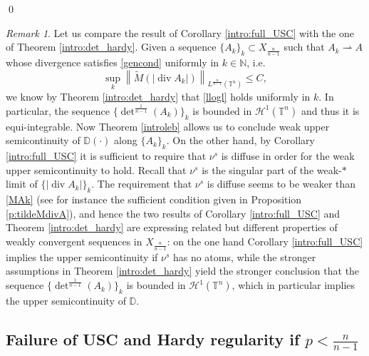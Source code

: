 \documentclass[10pt,reqno]{amsart}
\numberwithin{equation}{section}
\newcommand{\T}{\mathbb{T}}
\newcommand{\N}{\mathbb{N}}
\newcommand{\D}{\mathbb{D}}
\DeclareMathOperator{\dv}{div}
\theoremstyle{plain}
\theoremstyle{definition}
\theoremstyle{remark}
\newtheorem{rem}[Teo]{Remark}
\begin{document}
\qed




\begin{rem}\label{vs}
Let us compare the result of Corollary \ref{intro:full_USC} with the one of Theorem \ref{intro:det_hardy}. Given a sequence $\{A_k\}_k \subset X_\frac{n}{n - 1}$ such that $A_k \rightharpoonup A$ whose divergence satisfies \eqref{gencond} uniformly in $k \in \N$, i.e.
\begin{equation}\label{MAk}
\sup_k \left\|\tilde M (|\dv A_k|)\right\|_{L^\frac{n}{n - 1}(\T^n)} \le C,
\end{equation}
we know by Theorem \ref{intro:det_hardy} that \eqref{llogl} holds uniformly in $k$. In particular, the sequence $\{{\det}^\frac{1}{n-1}(A_k)\}_k$ is bounded in $\mathcal{H}^1(\T^n)$ and thus it is equi-integrable. Now Theorem \ref{introleb} allows us to conclude weak upper semicontinuity of $\D(\cdot)$ along $\{A_k\}_k$. On the other hand, by Corollary \ref{intro:full_USC} it is sufficient to require that $\nu^s$ is diffuse in order for the weak upper semicontinuity to hold. Recall that $\nu^s$ is the singular part of the weak-$*$ limit of $\{|\dv A_k|\}_{k}$. The requirement that $\nu^s$ is diffuse seems to be weaker than \eqref{MAk} (see for instance the sufficient condition given in Proposition \ref{p:tildeMdivA}), and hence the two results of Corollary \ref{intro:full_USC} and Theorem \ref{intro:det_hardy} are expressing related but different properties of weakly convergent sequences in $X_{\frac{n}{n - 1}}$: on the one hand Corollary \ref{intro:full_USC} implies the upper semicontinuity if $\nu^s$ has no atoms, while the stronger assumptions in Theorem \ref{intro:det_hardy} yield the stronger conclusion that the  sequence $\{{\det}^\frac{1}{n-1}(A_k)\}_k$ is bounded in $\mathcal{H}^1(\T^n)$, which in particular implies the upper semicontinuity of $\D$.
 \end{rem}




\subsection{Failure of USC and Hardy regularity if $p<\frac{n}{n-1}$}
\end{document}
